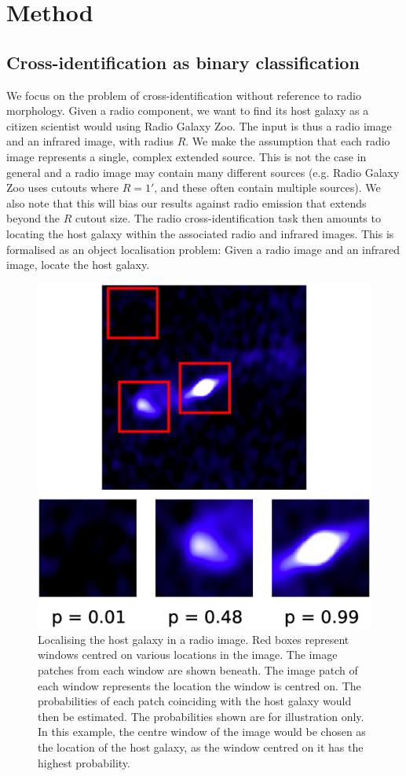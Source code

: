 \documentclass[fleqn,usenatbib,usedcolumn]{mnras}
\begin{document}
  \section{Method}\label{method}

  \subsection{Cross-identification as binary
  classification}\label{cross-identification-as-binary-classification}

    We focus on the problem of cross-identification without reference to radio
    morphology. Given a radio component, we want to find its host galaxy as a
    citizen scientist would using Radio Galaxy Zoo. The input is thus a radio
    image and an infrared image, with radius \(R\). We make the assumption
    that each radio image represents a single, complex extended source. This
    is not the case in general and a radio image may contain many different
    sources (e.g. Radio Galaxy Zoo uses cutouts where \(R = 1'\), and these
    often contain multiple sources). We also note that this will bias our
    results against radio emission that extends beyond the \(R\) cutout size.
    The radio cross-identification task then amounts to locating the host
    galaxy within the associated radio and infrared images. This is formalised
    as an object localisation problem: Given a radio image and an infrared
    image, locate the host galaxy.

    \begin{figure}[htbp]
      \centering
      \includegraphics[trim={5cm 0cm 4cm 5cm}, width=0.5\linewidth]{images/windows.eps}
      \caption{Localising the host galaxy in a radio image. Red boxes
        represent windows centred on various locations in the image. The image
        patches from each window are shown beneath. The image patch of each
        window represents the location the window is centred on. The
        probabilities of each patch coinciding with the host galaxy would then
        be estimated. The probabilities shown are for illustration only. In
        this example, the centre window of the image would be chosen as the
        location of the host galaxy, as the window centred on it has the
        highest probability.}
      \label{fig:windows}
    \end{figure}
\end{document}
